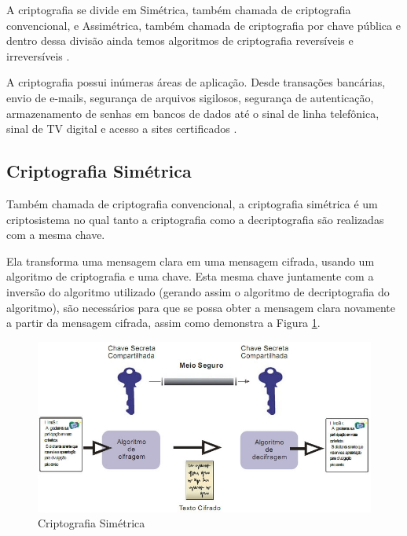 
A criptografia se divide em Simétrica, também chamada de criptografia convencional, e Assimétrica, também chamada de criptografia por chave pública \cite{stallings14} \cite{tanenbaum03} e dentro dessa divisão ainda temos algoritmos de criptografia reversíveis e irreversíveis \cite{stallings14} \cite{itu91}.

A criptografia possui inúmeras áreas de aplicação. Desde transações bancárias, envio de e-mails, segurança de arquivos sigilosos, segurança de autenticação, armazenamento de senhas em bancos de dados até o sinal de linha telefônica, sinal de TV digital e acesso a sites certificados \cite{avelino07}.

\subsection{Criptografia Simétrica}
\label{subsec:criptografiasync}
Também chamada de criptografia convencional, a criptografia simétrica é um criptosistema no qual tanto a criptografia como a decriptografia são realizadas com a mesma chave.

Ela transforma uma mensagem clara em uma mensagem cifrada, usando um algoritmo de criptografia e uma chave. Esta mesma chave juntamente com a inversão do algoritmo utilizado (gerando assim o algoritmo de decriptografia do algoritmo), são necessários para que se possa obter a mensagem clara novamente a partir da mensagem cifrada, assim como demonstra a Figura \ref{fig:cripsimerica}.

\begin{figure}[H]
    \centering
    \caption{Criptografia Simétrica}
    \label{fig:cripsimerica}
    \includegraphics[width=.8\linewidth]{Figuras/CripSimetrica.jpg}
\end{figure}

